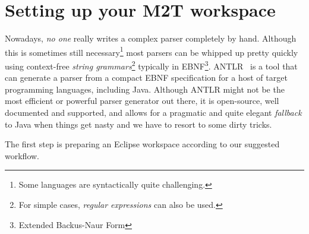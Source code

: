 \section{Setting up your M2T workspace}

Nowadays, \emph{no one} really writes a complex parser completely by hand.
Although this is sometimes still necessary\footnote{Some languages are syntactically quite challenging.} most parsers can be whipped up pretty quickly using context-free \emph{string grammars}\footnote{For simple cases, \emph{regular expressions} can also be used.} typically in EBNF\footnote{Extended Backus-Naur Form}.
ANTLR~\cite{ANTLR} is a tool that can generate a parser from a compact EBNF specification for a host of target programming languages, including Java.
Although ANTLR might not be the most efficient or powerful parser generator out there, it is open-source, well documented and supported, and allows for a pragmatic and quite elegant \emph{fallback} to Java when things get nasty and we have to resort to some dirty tricks.

The first step is preparing an Eclipse workspace according to our suggested workflow.

